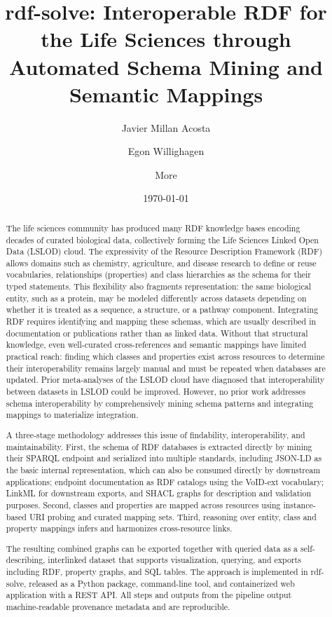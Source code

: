 \documentclass[12pt]{article}
\title{rdf-solve: Interoperable RDF for the Life Sciences through Automated Schema Mining and Semantic Mappings}
\author{Javier Millan Acosta \and Egon Willighagen \and More}                           %
\date{\today}
\begin{document}
\maketitle

\begin{abstract}

The life sciences community has produced many RDF knowledge bases encoding decades of curated biological
data, collectively forming the Life Sciences Linked Open Data (LSLOD) cloud.  %
The expressivity of the Resource Description Framework (RDF) allows domains such as chemistry, agriculture, and disease research to define or reuse vocabularies, relationships (properties) and class hierarchies as the schema for their typed statements. This flexibility also fragments 
representation: the same biological entity, such as a protein, may be modeled differently across datasets
depending on whether it is treated as a sequence, a structure, or a pathway component.
Integrating RDF requires identifying and mapping these schemas, which are usually described in documentation or publications rather than as linked data. Without that structural knowledge, even well-curated cross-references and semantic mappings have limited practical reach: finding which classes and properties exist across resources to determine their interoperability remains largely manual and must be repeated when databases are updated.
Prior meta-analyses of the LSLOD cloud have diagnosed that interoperability between datasets in LSLOD could be improved.  
However, no prior work addresses schema interoperability by comprehensively mining schema patterns and integrating mappings to materialize integration.  %

A three-stage methodology addresses this issue of findability, interoperability, and maintainability. First, the schema 
of RDF databases is extracted directly by mining their SPARQL endpoint and serialized into multiple standards, including JSON-LD as the basic internal representation, which can also be consumed directly by downstream applications; endpoint documentation as RDF catalogs using the VoID-ext vocabulary; LinkML for downstream exports, and SHACL graphs for description and validation purposes. Second, classes and properties are mapped across resources using instance-based URI probing and curated mapping sets. Third, reasoning over entity, class and property mappings infers and harmonizes cross-resource links.

The resulting combined graphs can be exported together with queried data as a self-describing, interlinked dataset that supports visualization, querying, and exports including RDF, property graphs, and SQL tables. The approach is implemented in rdf-solve, released as a Python package, command-line tool, and containerized web application with a REST API. All steps and outputs from the pipeline output machine-readable provenance metadata and are reproducible.  %

\end{abstract}
\end{document}
